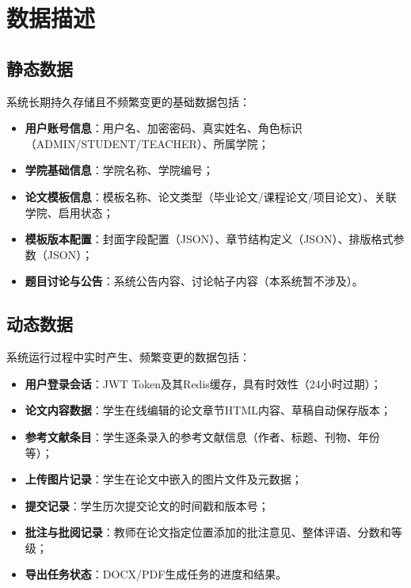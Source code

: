 \section{数据描述}

\subsection{静态数据}

系统长期持久存储且不频繁变更的基础数据包括：

\begin{itemize}
    \item \textbf{用户账号信息}：用户名、加密密码、真实姓名、角色标识（ADMIN/STUDENT/TEACHER）、所属学院；
    \item \textbf{学院基础信息}：学院名称、学院编号；
    \item \textbf{论文模板信息}：模板名称、论文类型（毕业论文/课程论文/项目论文）、关联学院、启用状态；
    \item \textbf{模板版本配置}：封面字段配置（JSON）、章节结构定义（JSON）、排版格式参数（JSON）；
    \item \textbf{题目讨论与公告}：系统公告内容、讨论帖子内容（本系统暂不涉及）。
\end{itemize}

\subsection{动态数据}

系统运行过程中实时产生、频繁变更的数据包括：

\begin{itemize}
    \item \textbf{用户登录会话}：JWT Token及其Redis缓存，具有时效性（24小时过期）；
    \item \textbf{论文内容数据}：学生在线编辑的论文章节HTML内容、草稿自动保存版本；
    \item \textbf{参考文献条目}：学生逐条录入的参考文献信息（作者、标题、刊物、年份等）；
    \item \textbf{上传图片记录}：学生在论文中嵌入的图片文件及元数据；
    \item \textbf{提交记录}：学生历次提交论文的时间戳和版本号；
    \item \textbf{批注与批阅记录}：教师在论文指定位置添加的批注意见、整体评语、分数和等级；
    \item \textbf{导出任务状态}：DOCX/PDF生成任务的进度和结果。
\end{itemize}


